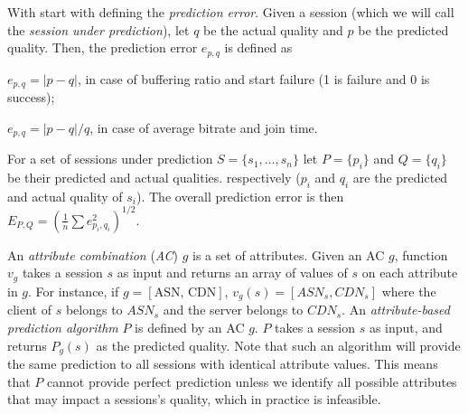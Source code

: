 \label{subsec:upperbound}

With start with defining the {\it prediction error}.  Given a session
(which we will call the {\it session under prediction}), let $q$ be
the actual quality and $p$ be the predicted quality. Then, the
prediction error $e_{p,q}$ is defined as
\begin{packeditemize}
	\item $e_{p,q}=|p-q|$, in case of buffering ratio and start failure (1 is failure and 0 is success);
	\item $e_{p,q}=|p-q|/q$, in case of average bitrate and join time.
\end{packeditemize}

For a set of sessions under prediction $S=\{s_1,\dots,s_n\}$ let $P=\{p_i\}$ and $Q=\{q_i\}$ be their predicted and actual qualities. respectively ($p_i$ and $q_i$ are the predicted and actual quality of $s_i$). The overall prediction error is then $E_{P,Q}=\left(\frac{1}{n}\sum e_{p_i,q_i}^2\right)^{1/2}$.

An {\it attribute combination} ({\it AC}) $g$ is a set of attributes. Given an AC $g$, function $v_g$ takes a session $s$ as input and returns an array of values of $s$ on each attribute in $g$. For instance, if $g=[\textrm{ASN, CDN}]$, $v_g(s)=[ASN_s,CDN_s]$ where the client of $s$ belongs to $ASN_s$ and the server belongs to $CDN_s$. An {\it attribute-based prediction algorithm} $P$  is defined by an AC $g$. $P$ takes a session $s$ as input, and returns $P_g(s)$ as the predicted quality. Note that such an algorithm will provide the same prediction to all sessions with identical attribute values. This means that $P$ cannot provide perfect prediction unless we identify all possible attributes that may impact a sessions's quality, which in practice is infeasible.
 

